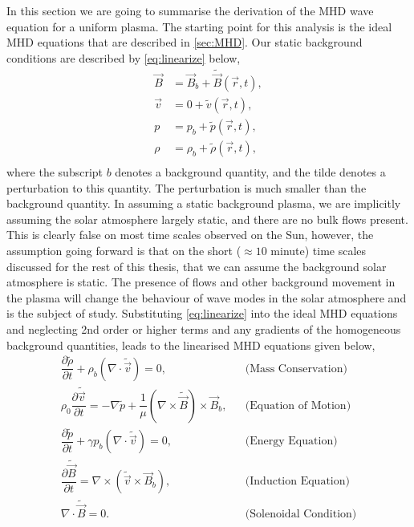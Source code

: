 In this section we are going to summarise the derivation of the MHD wave equation for a uniform plasma.
The starting point for this analysis is the ideal MHD equations that are described in \cref{sec:MHD}.
Our static background conditions are described by \cref{eq:linearize} below,
\begin{equation}\label{eq:linearize}
    \begin{aligned}                                                    
        \vec{B} &= \vec{B}_b + \tilde{\vec{B}}(\vec{r},t),\\
        \vec{v} &= 0 + \tilde{{v}}(\vec{r},t),\\
        p &= p_b + \tilde{p}(\vec{r},t),\\
        \rho &= \rho_b + {\tilde{\rho}}(\vec{r},t),\\
    \end{aligned}
\end{equation}
where the subscript $b$ denotes a background quantity, and the tilde denotes a perturbation to this quantity.
The perturbation is much smaller than the background quantity.
In assuming a static background plasma, we are implicitly assuming the solar atmosphere largely static, and there are no bulk flows present.
This is clearly false on most time scales observed on the Sun, however, the assumption going forward is that on the short ($\approx 10$ minute) time scales discussed for the rest of this thesis, that we can assume the background solar atmosphere is static.
The presence of flows and other background movement in the plasma will change the behaviour of wave modes in the solar atmosphere and is the subject of study. %
Substituting \cref{eq:linearize} into the ideal MHD equations and neglecting 2nd order or higher terms and any gradients of the homogeneous background quantities, leads to the linearised MHD equations given below,
\begin{align}                                                         
    \dfrac{\partial \tilde{\rho} }{\partial t} + \rho_b (\nabla \cdot \tilde{\vec{v}}) =       
    0,
    &&\text{(Mass Conservation)}\label{eq:lmhd_mass}\\
    \rho_0 \dfrac{\partial \tilde{\vec{v}}}{\partial t} =
    -\nabla \tilde{p} + \dfrac{1}{\mu}(\nabla \times \tilde{\vec{B}}) \times \vec{B}_b,
    &&\text{(Equation of Motion)}\label{eq:lmhd_motion}\\
    \dfrac{\partial \tilde{p}}{\partial t} + \gamma p_b \left( \nabla \cdot \tilde{\vec{v}} \right) = 0,
    &&\text{(Energy Equation)}\label{eq:lmhd_energy}\\
    \dfrac{\partial \tilde{\vec{B}}}{\partial t} = \nabla \times (\tilde{\vec{v}} \times \vec{B}_b),
    &&\text{(Induction Equation)}\label{eq:lmhd_induction}\\
    \nabla \cdot \tilde{\vec{B}} = 0.
    &&\text{(Solenoidal Condition)}\label{eq:lmhd_solenoid}              
\end{align}
